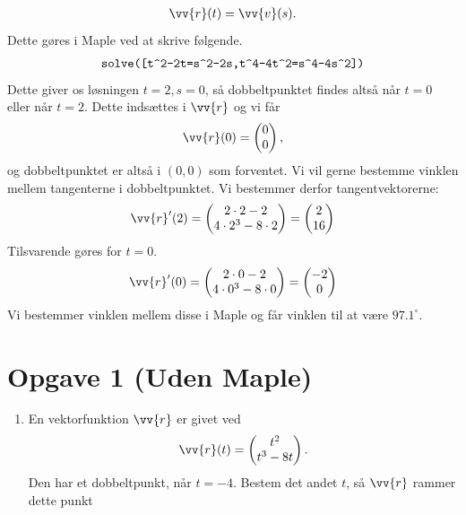 \begin{exa}
\begin{align*}
		 \vv{r}(t) = \vv{v}(s). 
	\end{align*}
	Dette gøres i Maple ved at skrive følgende. 
	\begin{align*}
		\texttt{solve([t\string^2-2t=s\string^2-2s,t\string^4-4t\string^2=s\string^4-4s\string^2])}
	\end{align*}
	Dette giver os løsningen $t= 2, s=0$, så dobbeltpunktet findes altså når $t=0$ eller når $t=2$. Dette indsættes i $\vv{r}$ og vi får
	\begin{align*}
		\vv{r}(0) = 
		\begin{pmatrix}
			0 \\ 0
		\end{pmatrix},
	\end{align*}
	og dobbeltpunktet er altså i $(0,0)$ som forventet. 
	Vi vil gerne bestemme vinklen mellem tangenterne i dobbeltpunktet. Vi bestemmer derfor tangentvektorerne:
	\begin{align*}
		\vv{r}'(2) = 
		\begin{pmatrix}
			2\cdot 2-2 \\
			4\cdot 2^3-8\cdot 2
		\end{pmatrix} =
		\begin{pmatrix}
			2 \\
			16
		\end{pmatrix}
	\end{align*}
	Tilsvarende gøres for $t=0$.
	\begin{align*}
		\vv{r}'(0) = 
		\begin{pmatrix}
			2\cdot 0 - 2 \\
			4\cdot 0^3-8\cdot 0
		\end{pmatrix} =
		\begin{pmatrix}
			-2 \\
			0
		\end{pmatrix}
	\end{align*}
	Vi bestemmer vinklen mellem disse i Maple og får vinklen til at være $97.1^\circ$.
\end{exa}

\section*{Opgave 1 (Uden Maple)}

\begin{enumerate}[label=\roman*)]
	\item En vektorfunktion $\vv{r}$ er givet ved
	\begin{align*}
		\vv{r}(t) = 
		\begin{pmatrix}
			t^2 \\
			t^3-8t
		\end{pmatrix}.
	\end{align*}
	Den har et dobbeltpunkt, når $t=-4$. Bestem det andet $t$, så $\vv{r}$ rammer dette punkt
\end{enumerate}
